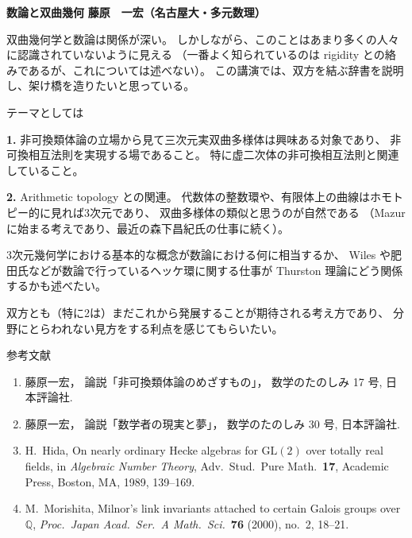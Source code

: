 \documentclass[uplatex,dvipdfmx]{jlreq}
\begin{document}
\newpage

\noindent
{\large\bfseries 数論と双曲幾何}
\hfill
{\large\bfseries 藤原　一宏（名古屋大・多元数理）}

\bigskip

双曲幾何学と数論は関係が深い。
しかしながら、このことはあまり多くの人々に認識されていないように見える
（一番よく知られているのは rigidity との絡みであるが、これについては述べない）。
この講演では、双方を結ぶ辞書を説明し、架け橋を造りたいと思っている。

テーマとしては

\medskip
\noindent\textbf{1.}\quad
非可換類体論の立場から見て三次元実双曲多様体は興味ある対象であり、
非可換相互法則を実現する場であること。
特に虚二次体の非可換相互法則と関連していること。

\medskip
\noindent\textbf{2.}\quad
Arithmetic topology との関連。
代数体の整数環や、有限体上の曲線はホモトピー的に見れば3次元であり、
双曲多様体の類似と思うのが自然である
（Mazur に始まる考えであり、最近の森下昌紀氏の仕事に続く）。

3次元幾何学における基本的な概念が数論における何に相当するか、
Wiles や肥田氏などが数論で行っているヘッケ環に関する仕事が
Thurston 理論にどう関係するかも述べたい。

\medskip

双方とも（特に2は）まだこれから発展することが期待される考え方であり、
分野にとらわれない見方をする利点を感じてもらいたい。

\vspace{6pt}

\begin{center}
  \textsc{参考文献}
\end{center}
\begin{enumerate}
  \item[{[1]}] 藤原一宏，
        論説「非可換類体論のめざすもの」，
        数学のたのしみ 17 号, 日本評論社.
  \item[{[2]}] 藤原一宏，
        論説「数学者の現実と夢」，
        数学のたのしみ 30 号, 日本評論社.
  \item[{[Hi]}] H.~Hida,
        On nearly ordinary Hecke algebras for $\mathrm{GL}(2)$
        over totally real fields,
        in \textit{Algebraic Number Theory},
        Adv.~Stud.~Pure Math.~\textbf{17},
        Academic Press, Boston, MA, 1989, 139--169.
  \item[{[Mo]}] M.~Morishita,
        Milnor's link invariants attached to certain Galois groups over $\mathbb{Q}$,
        \textit{Proc.~Japan Acad.~Ser.~A Math.~Sci.}~\textbf{76} (2000), no.~2, 18--21.
\end{enumerate}
\end{document}
